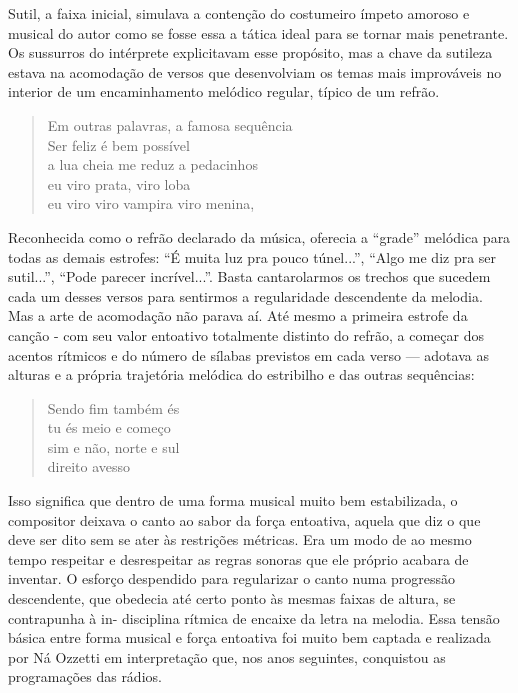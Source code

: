 Sutil, a faixa inicial, simulava a contenção do costumeiro ímpeto
amoroso e musical do autor como se fosse essa a tática ideal para se
tornar mais penetrante. Os sussurros do intérprete explicitavam esse
propósito, mas a chave da sutileza estava na acomodação de versos que
desenvolviam os temas mais improváveis no interior de um encaminhamento
melódico regular, típico de um refrão.

\begin{verse}
Em outras palavras, a famosa sequência\\
Ser feliz é bem possível\\
a lua cheia me reduz a pedacinhos\\
eu viro prata, viro loba\\
eu viro viro vampira viro menina,
\end{verse}

Reconhecida como o refrão declarado da música, oferecia a ``grade''
melódica para todas as demais estrofes: ``É muita luz pra pouco
túnel...'', ``Algo me diz pra ser sutil...'', ``Pode parecer
incrível...''. Basta cantarolarmos os trechos que sucedem cada um desses
versos para sentirmos a regularidade descendente da melodia. Mas a arte
de acomodação não parava aí. Até mesmo a primeira estrofe da canção -
com seu valor entoativo totalmente distinto do refrão, a começar dos
acentos rítmicos e do número de sílabas previstos em cada verso ---
adotava as alturas e a própria trajetória melódica do estribilho e das
outras sequências:

\begin{verse}
Sendo fim também és\\
tu és meio e começo\\
sim e não, norte e sul\\
direito avesso
\end{verse}

Isso significa que dentro de uma forma musical muito bem estabilizada, o
compositor deixava o canto ao sabor da força entoativa, aquela que diz o
que deve ser dito sem se ater às restrições métricas. Era um modo de ao
mesmo tempo respeitar e desrespeitar as regras sonoras que ele próprio
acabara de inventar. O esforço despendido para regularizar o canto numa
progressão descendente, que obedecia até certo ponto às mesmas faixas de
altura, se contrapunha à in- disciplina rítmica de encaixe da letra na
melodia. Essa tensão básica entre forma musical e força entoativa foi
muito bem captada e realizada por Ná Ozzetti em interpretação que, nos
anos seguintes, conquistou as programações das rádios.

